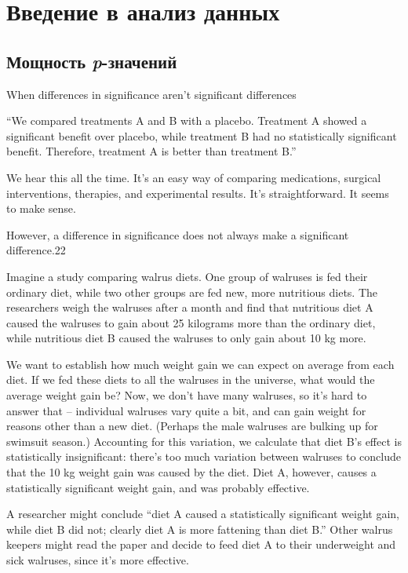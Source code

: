 \chapter{Введение в анализ данных}
\label{chp6}

\section{Мощность \emph{p}-значений}
\label{chp6: }

When differences in significance aren’t significant differences

“We compared treatments A and B with a placebo. Treatment A showed a significant benefit over placebo, while treatment B had no statistically significant benefit. Therefore, treatment A is better than treatment B.”

We hear this all the time. It’s an easy way of comparing medications, surgical interventions, therapies, and experimental results. It’s straightforward. It seems to make sense.

However, a difference in significance does not always make a significant difference.22

Imagine a study comparing walrus diets. One group of walruses is fed their ordinary diet, while two other groups are fed new, more nutritious diets. The researchers weigh the walruses after a month and find that nutritious diet A caused the walruses to gain about 25 kilograms more than the ordinary diet, while nutritious diet B caused the walruses to only gain about 10 kg more.

We want to establish how much weight gain we can expect on average from each diet. If we fed these diets to all the walruses in the universe, what would the average weight gain be? Now, we don’t have many walruses, so it’s hard to answer that – individual walruses vary quite a bit, and can gain weight for reasons other than a new diet. (Perhaps the male walruses are bulking up for swimsuit season.) Accounting for this variation, we calculate that diet B’s effect is statistically insignificant: there’s too much variation between walruses to conclude that the 10 kg weight gain was caused by the diet. Diet A, however, causes a statistically significant weight gain, and was probably effective.

A researcher might conclude “diet A caused a statistically significant weight gain, while diet B did not; clearly diet A is more fattening than diet B.” Other walrus keepers might read the paper and decide to feed diet A to their underweight and sick walruses, since it’s more effective.

